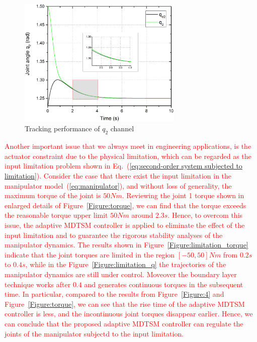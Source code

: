 \documentclass[3p]{elsarticle}
\theoremstyle{plain}
\theoremstyle{remark}
\begin{document}
\begin{figure}
\centering
\includegraphics[width=0.7\textwidth]{paper3_fig7.eps}
\caption{Tracking performance of $q_2$ channel}
\label{Figure:7}
\end{figure}
\textcolor{red}{Another important issue that we always meet in engineering applications, is the actuator constraint due to the physical limitation, which can be regarded as the input limitation problem shown in Eq.~(\ref{eq:second-order system subjected to limitation}). Consider the case that there exist the input limitation in the manipulator model~(\ref{eq:manipulator}), and without loss of generality, the maximum torque of the joint is $50Nm$. Reviewing the joint 1 torque shown in enlarged details of  Figure~\ref{Figure:torque}, we can find that the torque exceeds the reasonable torque upper limit $50Nm$ around $2.3s$. Hence, to overcom this issue, the adaptive MDTSM controller is applied to eliminate the effect of the input limitation and to guarantee the rigorous stability analyses of the manipulator dynamics. The results shown in Figure~\ref{Figure:limitation_torque} indicate that the joint torques are limited in the region $[-50,50]Nm$ from $0.2s$ to $0.4s$, while in the Figure~\ref{Figure:limitation_q} the trajectories of the manipulator dynamics are still under control. Moveover the boundary layer technique works after $0.4$ and generates continuous torques in the subsequent time. In particular, compared to the results from Figure~\ref{Figure:4} and Figure~\ref{Figure:torque}, we can see that the rise time of the adaptive MDTSM controller is less, and the incontinuous joint torques disappear earlier. Hence, we can conclude that the proposed adaptive MDTSM controller can regulate the joints of the manipulator subjectd to the input limitation.}
\end{document}
